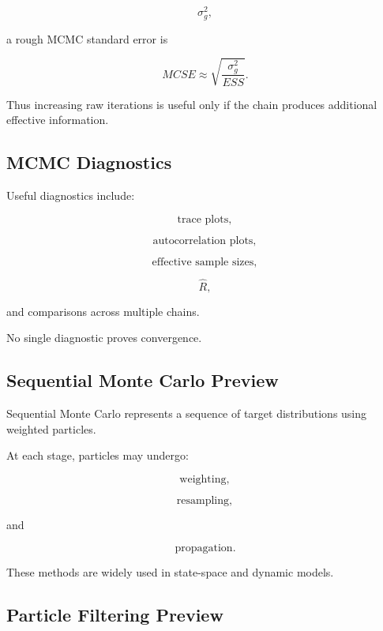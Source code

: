 \[
\sigma_g^2,
\]

a rough MCMC standard error is

\[
\boxed{
MCSE
\approx
\sqrt{
\frac{
\sigma_g^2
}{
ESS
}
}.
}
\]

Thus increasing raw iterations is useful only if the chain produces
additional effective information.

\subsection{MCMC Diagnostics}
\label{subsec:mcmc-diagnostics-computational}

Useful diagnostics include:

\[
\boxed{
\text{trace plots},
}
\]

\[
\boxed{
\text{autocorrelation plots},
}
\]

\[
\boxed{
\text{effective sample sizes},
}
\]

\[
\boxed{
\widehat{R},
}
\]

and comparisons across multiple chains.

No single diagnostic proves convergence.

\subsection{Sequential Monte Carlo Preview}
\label{subsec:sequential-monte-carlo-preview}

Sequential Monte Carlo represents a sequence of target distributions
using weighted particles.

At each stage, particles may undergo:

\[
\boxed{
\text{weighting},
}
\]

\[
\boxed{
\text{resampling},
}
\]

and

\[
\boxed{
\text{propagation}.
}
\]

These methods are widely used in state-space and dynamic models.

\subsection{Particle Filtering Preview}
\label{subsec:particle-filtering-preview}

